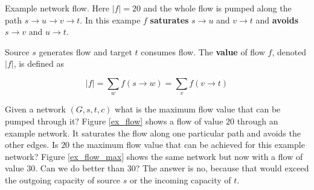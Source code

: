 \begin{marginfigure}
    \caption{Example network flow. Here $|f| = 20$ and the whole flow is pumped along the path $s \rightarrow u \rightarrow v \rightarrow t$. In this exampe $f$ \textbf{saturates} $s \rightarrow u$ and $v \rightarrow t$ and \textbf{avoids} $s \rightarrow v$ and $u \rightarrow t$.}
	\label{ex_flow}
\end{marginfigure}


Source $s$ generates flow and target $t$ consumes flow. The \textbf{value} of flow $f$, denoted $|f|$, is defined as

$$
|f| = \sum_w f(s \rightarrow w) = \sum_v f(v \rightarrow t)
$$

Given a network $(G, s, t, c)$ what is the maximum flow value that can be pumped through it? Figure \ref{ex_flow} shows a flow of value $20$ through an example network. It saturates the flow along one particular path and avoids the other edges. Is $20$ the maximum flow value that can be achieved for this example network? Figure \ref{ex_flow_max} shows the same network but now with a flow of value $30$. Can we do better than $30$? The answer is no, because that would exceed the outgoing capacity of source $s$ or the incoming capacity of $t$. 

